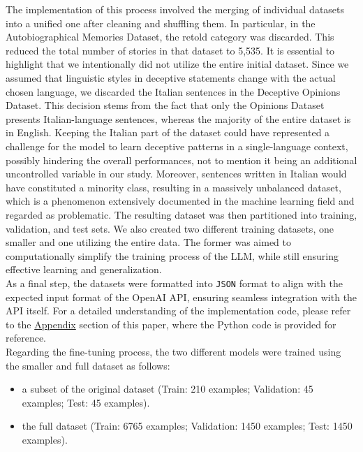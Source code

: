 \documentclass[10pt,twocolumn,letterpaper]{article}
\begin{document}
The implementation of this process involved the merging of individual datasets into a unified one after cleaning and shuffling them. 
In particular, in the Autobiographical Memories Dataset, the retold category was discarded. This reduced the total number of stories in that dataset to 5,535.
It is essential to highlight that we intentionally did not utilize the entire initial dataset. Since we assumed that linguistic styles in deceptive statements change 
with the actual chosen language, we discarded the Italian sentences in the Deceptive Opinions Dataset.
This decision stems from the fact that only the Opinions Dataset presents Italian-language sentences, whereas the majority of the entire dataset is in English. Keeping the Italian part of the dataset could have represented
a challenge for the model to learn deceptive patterns in a single-language context, possibly hindering the overall performances, not to mention it being an additional
uncontrolled variable in our study. Moreover, sentences written in Italian would have constituted a minority class, resulting in a massively unbalanced dataset,
which is a phenomenon extensively documented in the machine learning field and regarded as problematic. 
The resulting dataset was then partitioned into training, validation, and test sets.
We also created two different training datasets, one smaller and one utilizing the entire data. The former was aimed to computationally simplify the training process of the LLM, 
while still ensuring effective learning and generalization. \\

As a final step, the datasets were formatted into \texttt{JSON} format to align with the expected input format of the OpenAI API, ensuring seamless integration with the API itself. 
For a detailed understanding of the implementation code, please refer to the \hyperref[sec:appendix]{Appendix} section of this paper, where the Python code is provided for reference.\\

Regarding the fine-tuning process, the two different models were trained using the smaller and full dataset as follows:

\begin{itemize}
    \item a subset of the original dataset (Train: 210 examples; Validation: 45 examples; Test: 45 examples).
    \item the full dataset (Train: 6765 examples; Validation: 1450 examples; Test: 1450 examples).
\end{itemize} \\
\end{document}
